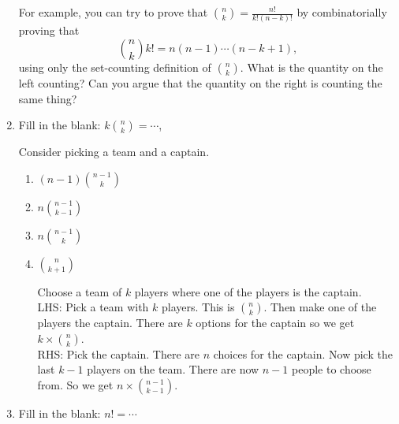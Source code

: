 \documentclass[11pt,preview]{standalone} %
\begin{document}
\begin{enumerate}
For example, you can try to prove that $\binom{n}{k} = \frac{n!}{k!(n-k)!}$ by combinatorially proving that \[
\binom{n}{k}k! = n(n-1) \cdots (n-k+1),\] 
using only the set-counting definition of $\binom{n}{k}$. What is the quantity on the left counting? Can you argue that the quantity on the right is counting the same thing?

\item Fill in the blank:
$k\binom{n}{k} = \cdots$, 

\begin{Choices}
\Hint Consider picking a team and a captain.
\begin{enumerate}
\FalseChoice\item $(n - 1)\binom{n-1}{k}$
\TrueChoice\item $n\binom{n - 1}{k - 1}$
\FalseChoice\item $n\binom{n - 1}{k}$
\FalseChoice\item $\binom{n}{k+1}$

\Solution Choose a team of $k$ players where one of the players is the captain. \\
LHS: Pick a team with $k$ players. This is ${n \choose k}$. Then make one of the players the captain. There are $k$ options for the captain so we get $k \times \binom{n}{k}$. \\
RHS: Pick the captain. There are $n$ choices for the captain. Now pick the last $k - 1$ players on the team. There are now $n - 1$ people to choose from. So we get $n \times \binom{n - 1}{k - 1}$.
\end{enumerate}
\end{Choices}

\item Fill in the blank:
$n! = \cdots$
\begin{enumerate}
\end{enumerate}


\end{enumerate}
\end{document}
